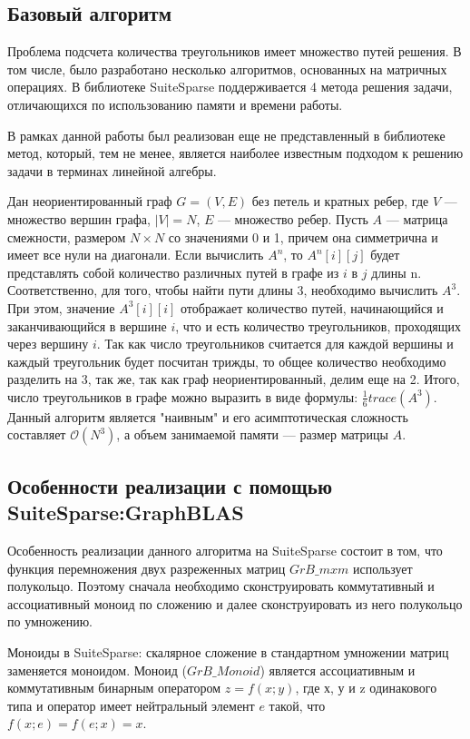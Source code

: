 \documentclass[14pt]{matmex-diploma}
\begin{document}
\subsection{Базовый алгоритм}

Проблема подсчета количества треугольников имеет множество путей решения. В том числе, было разработано несколько алгоритмов, основанных на матричных операциях. В библиотеке SuiteSparse поддерживается 4 метода решения задачи, отличающихся по использованию памяти и времени работы.

В рамках данной работы был реализован еще не представленный в библиотеке метод, который, тем не менее, является наиболее известным подходом к решению задачи в терминах линейной алгебры. 

Дан неориентированный граф $G = (V, E)$ без петель и кратных ребер, где $V$ --- множество вершин графа, $|V| = N$, $E$ --- множество ребер. Пусть $A$ --- матрица смежности, размером $N \times N$ со значениями 0 и 1, причем она симметрична и имеет все нули на диагонали. Если вычислить $A^n$, то $A^n[i][j]$ будет представлять собой количество различных путей в графе из $i$ в $j$ длины n. Соответственно, для того, чтобы найти пути длины 3, необходимо вычислить $A^3$. При этом, значение $A^3[i][i]$ отображает количество путей, начинающийся и заканчивающийся в вершине $i$, что и есть количество треугольников, проходящих через вершину $i$. Так как число треугольников считается для каждой вершины и каждый треугольник будет посчитан трижды, то общее количество необходимо разделить на 3, так же, так как граф неориентированный, делим еще на 2. Итого, число треугольников в графе можно выразить в виде формулы: $\frac{1}{6} trace(A^{3})$. Данный алгоритм является "наивным" и его асимптотическая сложность составляет $\mathcal{O}(N^3)$, а объем занимаемой памяти --- размер матрицы $A$.
 
\subsection{Особенности реализации с помощью \\ SuiteSparse:GraphBLAS}
Особенность реализации данного алгоритма на SuiteSparse состоит в том, что функция перемножения двух разреженных матриц $GrB\_mxm$ использует полукольцо. Поэтому сначала необходимо сконструировать коммутативный и ассоциативный моноид по сложению и далее сконструировать из него полукольцо по умножению.

    Моноиды в SuiteSparse: скалярное сложение в стандартном умножении матриц заменяется моноидом. Моноид ($GrB\_Monoid$) является ассоциативным и коммутативным бинарным
оператором $z = f(x; y)$, где х, у и z одинакового типа и оператор имеет
нейтральный элемент $e$ такой, что $f(x; e) = f(e; x) = x$.
\end{document}
